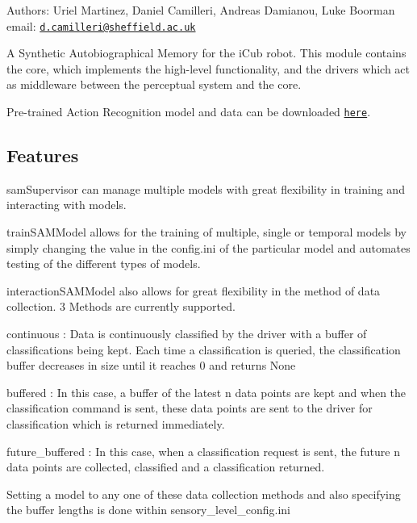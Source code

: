 Authors\+: Uriel Martinez, Daniel Camilleri, Andreas Damianou, Luke Boorman email\+: \href{mailto:d.camilleri@sheffield.ac.uk}{\tt d.\+camilleri@sheffield.\+ac.\+uk}

A Synthetic Autobiographical Memory for the i\+Cub robot. This module contains the core, which implements the high-\/level functionality, and the drivers which act as middleware between the perceptual system and the core.

Pre-\/trained Action Recognition model and data can be downloaded \href{https://drive.google.com/open?id=0B6fkkRLTYjNLbjFFSEZtUmtHNk0}{\tt here}.

\subsection*{Features}


\begin{DoxyItemize}
\item {\ttfamily sam\+Supervisor} can manage multiple models with great flexibility in training and interacting with models.
\item {\ttfamily train\+S\+A\+M\+Model} allows for the training of multiple, single or temporal models by simply changing the value in the config.\+ini of the particular model and automates testing of the different types of models.
\item {\ttfamily interaction\+S\+A\+M\+Model} also allows for great flexibility in the method of data collection. 3 Methods are currently supported.
\begin{DoxyEnumerate}
\item {\ttfamily continuous} \+: Data is continuously classified by the driver with a buffer of classifications being kept. Each time a classification is queried, the classification buffer decreases in size until it reaches 0 and returns None
\item {\ttfamily buffered} \+: In this case, a buffer of the latest n data points are kept and when the classification command is sent, these data points are sent to the driver for classification which is returned immediately.
\item {\ttfamily future\+\_\+buffered} \+: In this case, when a classification request is sent, the future n data points are collected, classified and a classification returned.
\end{DoxyEnumerate}
\end{DoxyItemize}

Setting a model to any one of these data collection methods and also specifying the buffer lengths is done within {\ttfamily sensory\+\_\+level\+\_\+config.\+ini}

